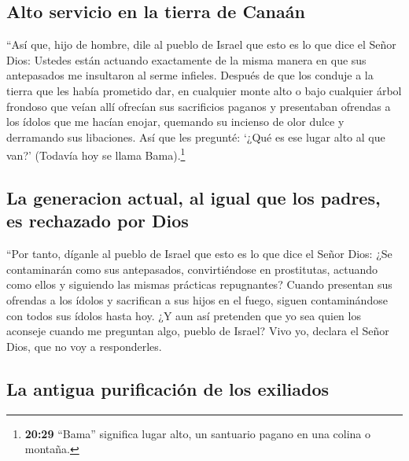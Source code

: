 \hypertarget{alto-servicio-en-la-tierra-de-canauxe1n}{%
\subsection{Alto servicio en la tierra de
Canaán}\label{alto-servicio-en-la-tierra-de-canauxe1n}}

 ``Así que, hijo de hombre, dile al pueblo de Israel que
esto es lo que dice el Señor Dios: Ustedes están actuando exactamente de
la misma manera en que sus antepasados me insultaron al serme infieles.
 Después de que los conduje a la tierra que les había
prometido dar, en cualquier monte alto o bajo cualquier árbol frondoso
que veían allí ofrecían sus sacrificios paganos y presentaban ofrendas a
los ídolos que me hacían enojar, quemando su incienso de olor dulce y
derramando sus libaciones.  Así que les pregunté: `¿Qué
es ese lugar alto al que van?' (Todavía hoy se llama Bama).\footnote{\textbf{20:29}
  ``Bama'' significa lugar alto, un santuario pagano en una colina o
  montaña.}

\hypertarget{la-generacion-actual-al-igual-que-los-padres-es-rechazado-por-dios}{%
\subsection{La generacion actual, al igual que los padres, es rechazado
por
Dios}\label{la-generacion-actual-al-igual-que-los-padres-es-rechazado-por-dios}}

 ``Por tanto, díganle al pueblo de Israel que esto es lo
que dice el Señor Dios: ¿Se contaminarán como sus antepasados,
convirtiéndose en prostitutas, actuando como ellos y siguiendo las
mismas prácticas repugnantes?  Cuando presentan sus
ofrendas a los ídolos y sacrifican a sus hijos en el fuego, siguen
contaminándose con todos sus ídolos hasta hoy. ¿Y aun así pretenden que
yo sea quien los aconseje cuando me preguntan algo, pueblo de Israel?
Vivo yo, declara el Señor Dios, que no voy a responderles.

\hypertarget{la-antigua-purificaciuxf3n-de-los-exiliados}{%
\subsection{La antigua purificación de los
exiliados}\label{la-antigua-purificaciuxf3n-de-los-exiliados}}

